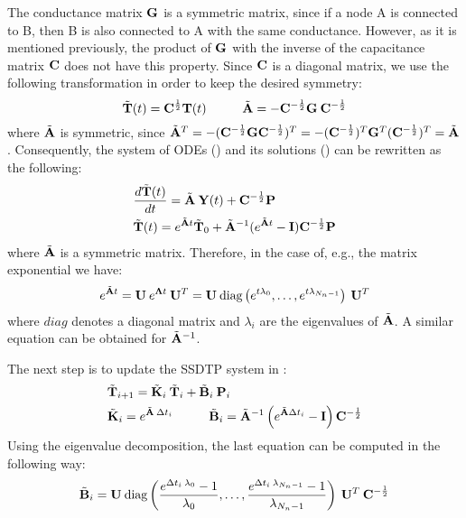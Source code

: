 The conductance matrix $\mathbf{G}$ is a symmetric matrix, since if a node A is connected to B, then B is also connected to A with the same conductance. However, as it is mentioned previously, the product of $\mathbf{G}$ with the inverse of the capacitance matrix $\mathbf{C}$ does not have this property. Since $\mathbf{C}$ is a diagonal matrix, we use the following transformation in order to keep the desired symmetry:
\begin{equation} \label{eq:substitution}
  \tilde{\v{T}}(t) = \m{C}^{\frac{1}{2}} \v{T}(t) \hs \tilde{\m{A}} = -\m{C}^{-\frac{1}{2}} \m{G} \: \m{C}^{-\frac{1}{2}}
\end{equation}
where $\tilde{\mathbf{A}}$ is symmetric, since $\tilde{\mathbf{A}}^T = -(\mathbf{C}^{-\frac{1}{2}} \mathbf{G} \mathbf{C}^{-\frac{1}{2}})^T = -(\mathbf{C}^{-\frac{1}{2}})^T \mathbf{G}^T (\mathbf{C}^{-\frac{1}{2}})^T = \tilde{\mathbf{A}}$. Consequently, the system of ODEs () and its solutions () can be rewritten as the following:
\begin{align*}
  & \frac{d\tilde{\mathbf{T}}(t)}{dt} = \tilde{\mathbf{A}} \: \mathbf{Y}(t) + \mathbf{C}^{-\frac{1}{2}} \mathbf{P} \\
  & \tilde{\mathbf{T}}(t) = e^{\tilde{\mathbf{A}} t} \tilde{\mathbf{T}}_0 + \tilde{\mathbf{A}}^{-1} (e^{\tilde{\mathbf{A}} t} - \mathbf{I}) \mathbf{C}^{-\frac{1}{2}} \mathbf{P}
\end{align*}
where $\tilde{\mathbf{A}}$ is a symmetric matrix. Therefore, in the case of, e.g., the matrix exponential we have:
\begin{equation} \label{eq:matrix-exponential}
  e^{\tilde{\mathbf{A}} t} = \mathbf{U} \: e^{\mathbf{\Lambda} t} \: \mathbf{U}^T = \mathbf{U} \: \text{diag} \left( e^{t \lambda_0}, \dots, e^{t \lambda_{N_n - 1}} \right) \: \mathbf{U}^T
\end{equation}
where $diag$ denotes a diagonal matrix and $\lambda_i$ are the eigenvalues of $\tilde{\mathbf{A}}$. A similar equation can be obtained for $\tilde{\mathbf{A}}^{-1}$.

The next step is to update the SSDTP system in :
\begin{align}
  & \tv{T}_{i+1} = \tm{K}_i \: \tv{T}_i + \tm{B}_i \: \v{P}_i \label{eq:recurrent-equation} \\
  & \tm{K}_i = e^{\tm{A} \: \Delta t_i} \hs \tm{B}_i = \tm{A}^{-1} \left( e^{\tm{A} \Delta t_i} - \m{I} \right) \m{C}^{-\frac{1}{2}} \nonumber
\end{align}
Using the eigenvalue decomposition, the last equation can be computed in the following way:
\[
  \tilde{\mathbf{B}}_i = \mathbf{U} \: \text{diag} \left( \frac{e^{\Delta t_i \: \lambda_0} - 1}{\lambda_0}, \dots, \frac{e^{\Delta t_i \: \lambda_{N_n - 1}} - 1}{\lambda_{N_n - 1}} \right) \: \mathbf{U}^T \: \mathbf{C}^{-\frac{1}{2}}
\]

